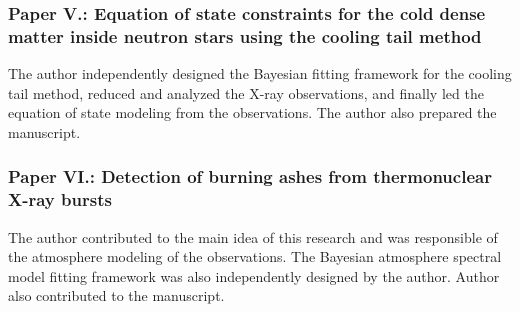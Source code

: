 %


\subsubsection*{Paper V.: Equation of state constraints for the cold dense matter inside neutron stars using the cooling tail method}
The author independently designed the Bayesian fitting framework for the cooling tail method, reduced and analyzed the X-ray observations, and finally led the equation of state modeling from the observations. 
The author also prepared the manuscript.


\subsubsection*{Paper VI.: Detection of burning ashes from thermonuclear X-ray bursts}
The author contributed to the main idea of this research and was responsible of the atmosphere modeling of the observations. 
The Bayesian atmosphere spectral model fitting framework was also independently designed by the author. 
Author also contributed to the manuscript.


%


